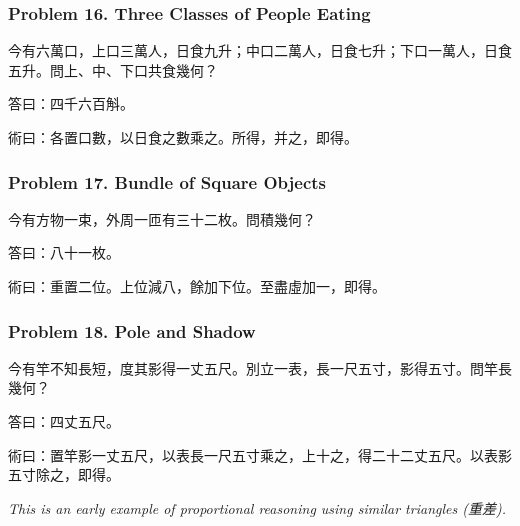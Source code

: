 \documentclass[11pt,a4paper]{article}
\newcommand{\zh}[1]{{\CJKfamily{}#1}}
\begin{document}
\subsubsection*{Problem 16. Three Classes of People Eating}

\begin{problembox}[title=\zh{問}]
\zh{今有六萬口，上口三萬人，日食九升；中口二萬人，日食七升；下口一萬人，日食五升。問上、中、下口共食幾何？}
\end{problembox}
\begin{answerbox}[title=\zh{答}]
\zh{答曰：四千六百斛。}
\end{answerbox}
\begin{methodbox}[title=\zh{術}]
\zh{術曰：各置口數，以日食之數乘之。所得，并之，即得。}
\end{methodbox}

\subsubsection*{Problem 17. Bundle of Square Objects}

\begin{problembox}[title=\zh{問}]
\zh{今有方物一束，外周一匝有三十二枚。問積幾何？}
\end{problembox}
\begin{answerbox}[title=\zh{答}]
\zh{答曰：八十一枚。}
\end{answerbox}
\begin{methodbox}[title=\zh{術}]
\zh{術曰：重置二位。上位減八，餘加下位。至盡虛加一，即得。}
\end{methodbox}

\subsubsection*{Problem 18. Pole and Shadow}

\begin{problembox}[title=\zh{問}]
\zh{今有竿不知長短，度其影得一丈五尺。別立一表，長一尺五寸，影得五寸。問竿長幾何？}
\end{problembox}
\begin{answerbox}[title=\zh{答}]
\zh{答曰：四丈五尺。}
\end{answerbox}
\begin{methodbox}[title=\zh{術}]
\zh{術曰：置竿影一丈五尺，以表長一尺五寸乘之，上十之，得二十二丈五尺。以表影五寸除之，即得。}
\end{methodbox}

\textit{This is an early example of proportional reasoning using similar triangles (\zh{重差}).}
\end{document}
